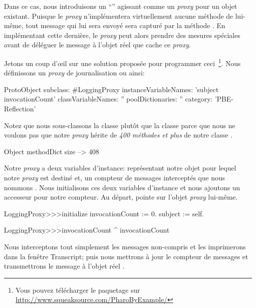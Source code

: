 \documentclass[a4paper,10pt,twoside]{book}
\begin{document}
Dans ce cas, nous introduisons un ``''
agissant comme un \emph{proxy} pour un objet existant.
Puisque le \emph{proxy} n'implémentera virtuellement aucune méthode de lui-même, tout message qui lui sera envoyé sera capturé par la méthode
 . En implémentant cette dernière, le \emph{proxy} peut alors prendre des mesures spéciales avant de déléguer le message à l'objet réel que cache ce \emph{proxy}.

Jetons un coup d'\oe il sur une solution proposée pour programmer ceci~\footnote{Vous pouvez télécharger le paquetage  sur \url{http://www.squeaksource.com/PharoByExample/}}.
Nous définissons un \emph{proxy} de journalisation ou  ainsi:

\begin{code}{}
ProtoObject subclass: #LoggingProxy
	instanceVariableNames: 'subject invocationCount'
	classVariableNames: ''
	poolDictionaries: ''
	category: 'PBE-Reflection'
\end{code}
Notez que nous sous-classons la classe  plutôt que la classe
 parce que nous ne voulons pas que notre \emph{proxy} hérite de \emph{400 méthodes et plus} de notre classe .

\begin{code}{}
Object methodDict size --> 408
\end{code}

Notre \emph{proxy} a deux variables d'instance:
 représentant notre objet pour lequel notre \emph{proxy} est destiné et, un compteur de messages interceptés que nous nommons .
Nous initialisons ces deux variables d'instance et nous ajoutons un accesseur pour notre compteur.
Au départ,  pointe sur l'objet \emph{proxy} lui-même.

\begin{code}{}
LoggingProxy>>>initialize
	invocationCount := 0.
	subject := self.
\end{code}

\begin{code}{}
LoggingProxy>>>invocationCount
	^ invocationCount
\end{code}

Nous interceptons tout simplement les messages non-compris et les imprimerons dans la fenêtre Transcript; puis nous mettrons à jour le compteur de messages et transmettrons le message à l'objet réel .
\end{document}
